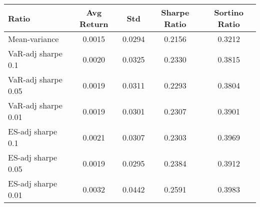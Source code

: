 \begin{tabular}{lcccc}
\toprule
Ratio & Avg Return & Std & Sharpe Ratio & Sortino Ratio\\
\midrule
Mean-variance & 0.0015 & 0.0294 & 0.2156 & 0.3212\\
VaR-adj sharpe 0.1 & 0.0020 & 0.0325 & 0.2330 & 0.3815\\
VaR-adj sharpe 0.05 & 0.0019 & 0.0311 & 0.2293 & 0.3804\\
VaR-adj sharpe 0.01 & 0.0019 & 0.0301 & 0.2307 & 0.3901\\
ES-adj sharpe 0.1 & 0.0021 & 0.0307 & 0.2303 & 0.3969\\
ES-adj sharpe 0.05 & 0.0019 & 0.0295 & 0.2384 & 0.3912\\
ES-adj sharpe 0.01 & 0.0032 & 0.0442 & 0.2591 & 0.3983\\
\bottomrule
\end{tabular}
